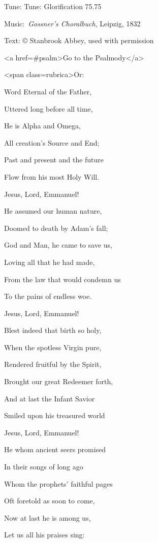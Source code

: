 \begin{hymnsource}
Tune: Tune: Glorification 75.75

Music: \emph{Gossner’s Choralbuch}, Leipzig, 1832

Text: © Stanbrook Abbey, used with permission



<a href=#psalm>Go to the Psalmody</a>



<span class=rubrica>Or:



Word Eternal of the Father,

Uttered long before all time, 

He is Alpha and Omega,

All creation’s Source and End;

Past and present and the future

Flow from his most Holy Will.

Jesus, Lord, Emmanuel!



He assumed our human nature, 

Doomed to death by Adam’s fall;

God and Man, he came to save us, 

Loving all that he had made, 

From the law that would condemn us

To the pains of endless woe. 

Jesus, Lord, Emmanuel!



Blest indeed that birth so holy, 

When the spotless Virgin pure,

Rendered fruitful by the Spirit,

Brought our great Redeemer forth,

And at last the Infant Savior

Smiled upon his treasured world

Jesus, Lord, Emmanuel!



He whom ancient seers promised

In their songs of long ago

Whom the prophets’ faithful pages

Oft foretold as soon to come,

Now at last he is among us,

Let us all his praises sing:


\end{hymnsource}
